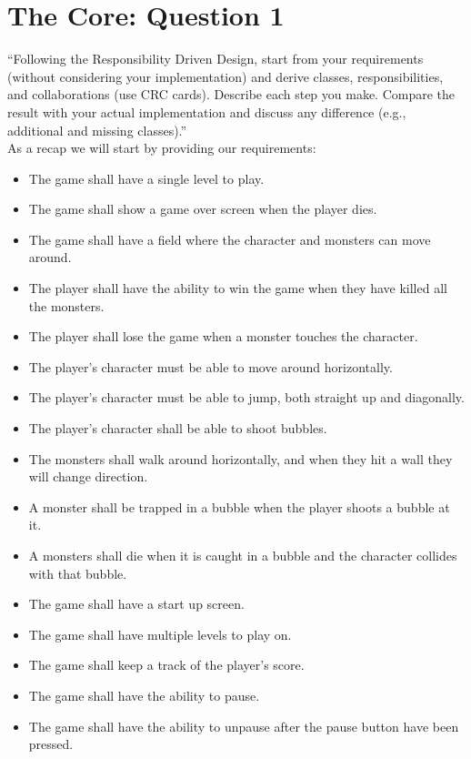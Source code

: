 \chapter{The Core: Question 1}

``Following the Responsibility Driven Design, start from your requirements (without considering your implementation) and derive classes, responsibilities, and collaborations (use CRC cards). Describe each step you make. Compare the result with your actual implementation and discuss any difference (e.g., additional and missing classes).'' \\

As a recap we will start by providing our requirements: \\
\begin{itemize}
    \item The game shall have a single level to play.
    \item The game shall show a game over screen when the player dies.
  \item The game shall have a field where the character and monsters can move around.
    \item The player shall have the ability to win the game when they have killed all the monsters.
  \item The player shall lose the game when a monster touches the character.
    \item The player's character must be able to move around horizontally.
    \item The player's character must be able to jump, both straight up and diagonally.
    \item The player's character shall be able to shoot bubbles.
    \item The monsters shall walk around horizontally, and when they hit a wall they will change direction. 
  \item A monster shall be trapped in a bubble when the player shoots a bubble at it.
  \item A monsters shall die when it is caught in a bubble and the character collides with that bubble.
   \item The game shall have a start up screen.
   \item The game shall have multiple levels to play on.
   \item The game shall keep a track of the player's score.
   \item The game shall have the ability to pause.
   \item The game shall have the ability to unpause after the pause button have been pressed.

\end{itemize}
